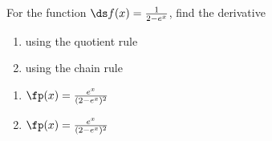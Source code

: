 {For the function $\ds f(x)=\frac{1}{2-e^x}$, find the derivative
\begin{enumerate}
\item using the quotient rule
\item using the chain rule
\end{enumerate}
}
{\begin{enumerate}
\item $\fp(x) = \frac{e^x}{(2-e^x)^2}$
\item $\fp(x) = \frac{e^x}{(2-e^x)^2}$
\end{enumerate}
}
